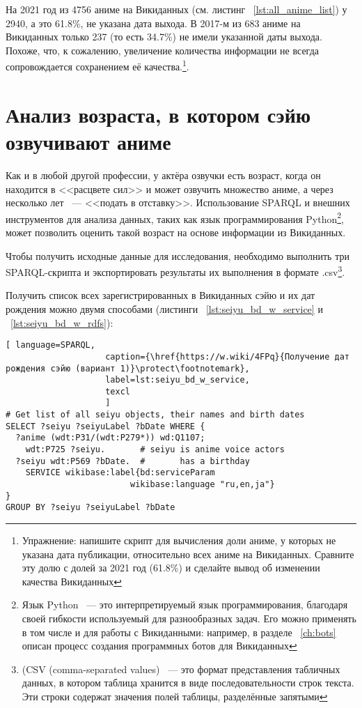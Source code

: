 На 2021 год из \num{4756} аниме на Викиданных (см. листинг ~\protect\ref{lst:all_anime_list}) у \num{2940}, а это \num{61.8}\%, не указана дата выхода. В 2017-м из \num{683} аниме на Викиданных только \num{237} (то есть \num{34.7}\%) не имели указанной даты выхода. Похоже, что, к сожалению, увеличение количества информации не всегда сопровождается сохранением её качества.\footnote{Упражнение: напишите скрипт для вычисления доли аниме, у которых не указана дата публикации, относительно всех аниме на Викиданных. Сравните эту долю с долей за 2021 год (\num{61.8}\%) и сделайте вывод об изменении качества Викиданных}.

\section{Анализ возраста, в котором сэйю озвучивают аниме}

Как и в любой другой профессии, у актёра озвучки есть возраст, когда он находится в <<расцвете сил>> и может озвучить множество аниме, а через несколько лет ~--- <<подать в отставку>>. Использование SPARQL и внешних инструментов для анализа данных, таких как язык программирования Python\footnote{Язык Python ~--- это интерпретируемый язык программирования, благодаря своей гибкости используемый для разнообразных задач. Его можно применять в том числе и для работы с Викиданными: например, в разделе ~\ref{ch:bots} описан процесс создания программных ботов для Викиданных}, может позволить оценить такой возраст на основе информации из Викиданных.

Чтобы получить исходные данные для исследования, необходимо выполнить три SPARQL-скрипта и экспортировать результаты их выполнения в формате .csv\footnote{(CSV (comma-separated values) ~--- это формат представления табличных данных, в котором таблица хранится в виде последовательности строк текста. Эти строки содержат значения полей таблицы, разделённые запятыми}.

Получить список всех зарегистрированных в Викиданных сэйю и их дат рождения можно двумя способами (листинги  ~\protect\ref{lst:seiyu_bd_w_service} и  ~\protect\ref{lst:seiyu_bd_w_rdfs}): 

\begin{lstlisting}[ language=SPARQL, 
                    caption={\href{https://w.wiki/4FPq}{Получение дат рождения сэйю (вариант 1)}\protect\footnotemark},
                    label=lst:seiyu_bd_w_service,
                    texcl 
                    ]
# Get list of all seiyu objects, their names and birth dates
SELECT ?seiyu ?seiyuLabel ?bDate WHERE {
  ?anime (wdt:P31/(wdt:P279*)) wd:Q1107;
    wdt:P725 ?seiyu.       # seiyu is anime voice actors
  ?seiyu wdt:P569 ?bDate.  #       has a birthday
    SERVICE wikibase:label{bd:serviceParam
					     wikibase:language "ru,en,ja"}
}
GROUP BY ?seiyu ?seiyuLabel ?bDate
\end{lstlisting}%

